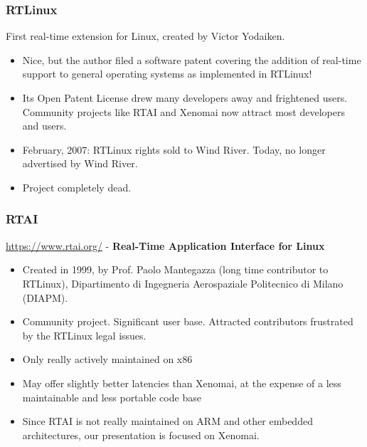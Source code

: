 \begin{frame}
  \frametitle{RTLinux}
  First real-time extension for Linux, created by Victor Yodaiken.
  \begin{itemize}
  \item Nice, but the author filed a software patent covering the
    addition of real-time support to general operating systems as
    implemented in RTLinux!
  \item Its Open Patent License drew many developers away and
    frightened users.  Community projects like RTAI and Xenomai now
    attract most developers and users.
  \item February, 2007: RTLinux rights sold to Wind River. Today,
    no longer advertised by Wind River.
  \item Project completely dead.
  \end{itemize}
\end{frame}

\begin{frame}
  \frametitle{RTAI}
  \url{https://www.rtai.org/} - {\bf Real-Time Application Interface for Linux}
  \begin{itemize}
  \item Created in 1999, by Prof. Paolo Mantegazza (long time
    contributor to RTLinux), Dipartimento di Ingegneria Aerospaziale
    Politecnico di Milano (DIAPM).
  \item Community project. Significant user base. Attracted
    contributors frustrated by the RTLinux legal issues.
  \item Only really actively maintained on x86
  \item May offer slightly better latencies than Xenomai, at the
    expense of a less maintainable and less portable code base
  \item Since RTAI is not really maintained on ARM and other embedded
    architectures, our presentation is focused on Xenomai.
  \end{itemize}
\end{frame}

